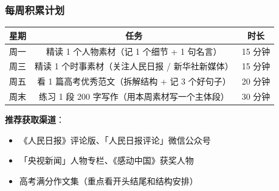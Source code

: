 \subsubsection{每周积累计划}

\begin{center}
\begin{tabular}{c|c|c}
\textbf{星期} & \textbf{任务} & \textbf{时长} \\ \hline
周一 & 精读 1 个人物素材（记 1 个细节 + 1 句名言） & 15 分钟 \\
周三 & 精读 1 个时事素材（关注人民日报 / 新华社新媒体） & 15 分钟 \\
周五 & 看 1 篇高考优秀范文（拆解结构 + 记 3 个好句子） & 20 分钟 \\
周末 & 练习 1 段 200 字写作（用本周素材写一个主体段） & 30 分钟 \\
\end{tabular}
\end{center}

\textbf{推荐获取渠道}：
\begin{itemize}
  \item 《人民日报》评论版、「人民日报评论」微信公众号
  \item 「央视新闻」人物专栏、《感动中国》获奖人物
  \item 高考满分作文集（重点看开头结尾和结构安排）
\end{itemize}
